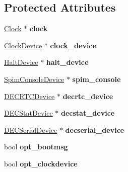\subsection*{Protected Attributes}
\begin{DoxyCompactItemize}
\item 
\hypertarget{classvmips_a0953c7ad4349b5cf5c4396b0b85d6aba}{
\hyperlink{classClock}{Clock} $\ast$ {\bfseries clock}}
\label{classvmips_a0953c7ad4349b5cf5c4396b0b85d6aba}

\item 
\hypertarget{classvmips_a5434d8b73ef3d316e3c7c254ef445028}{
\hyperlink{classClockDevice}{ClockDevice} $\ast$ {\bfseries clock\_\-device}}
\label{classvmips_a5434d8b73ef3d316e3c7c254ef445028}

\item 
\hypertarget{classvmips_a1e36783bf8b1e79e8b6d5b34feaf12db}{
\hyperlink{classHaltDevice}{HaltDevice} $\ast$ {\bfseries halt\_\-device}}
\label{classvmips_a1e36783bf8b1e79e8b6d5b34feaf12db}

\item 
\hypertarget{classvmips_aa51d2bbd33d18409ff22698c4cd6f924}{
\hyperlink{classSpimConsoleDevice}{SpimConsoleDevice} $\ast$ {\bfseries spim\_\-console}}
\label{classvmips_aa51d2bbd33d18409ff22698c4cd6f924}

\item 
\hypertarget{classvmips_ae94fc21627cb58c51d2924ac34fc159a}{
\hyperlink{classDECRTCDevice}{DECRTCDevice} $\ast$ {\bfseries decrtc\_\-device}}
\label{classvmips_ae94fc21627cb58c51d2924ac34fc159a}

\item 
\hypertarget{classvmips_a65a336362e2697c44e29ac552956e601}{
\hyperlink{classDECStatDevice}{DECStatDevice} $\ast$ {\bfseries decstat\_\-device}}
\label{classvmips_a65a336362e2697c44e29ac552956e601}

\item 
\hypertarget{classvmips_ac048b9d198c5c6aa60bd08b1cae9c589}{
\hyperlink{classDECSerialDevice}{DECSerialDevice} $\ast$ {\bfseries decserial\_\-device}}
\label{classvmips_ac048b9d198c5c6aa60bd08b1cae9c589}

\item 
\hypertarget{classvmips_a562fa4cb239eac6ea40f91acd5be8842}{
bool {\bfseries opt\_\-bootmsg}}
\label{classvmips_a562fa4cb239eac6ea40f91acd5be8842}

\item 
\hypertarget{classvmips_a0b4556b2e97d14a33240e6712700fea2}{
bool {\bfseries opt\_\-clockdevice}}
\label{classvmips_a0b4556b2e97d14a33240e6712700fea2}


\end{DoxyCompactItemize}
